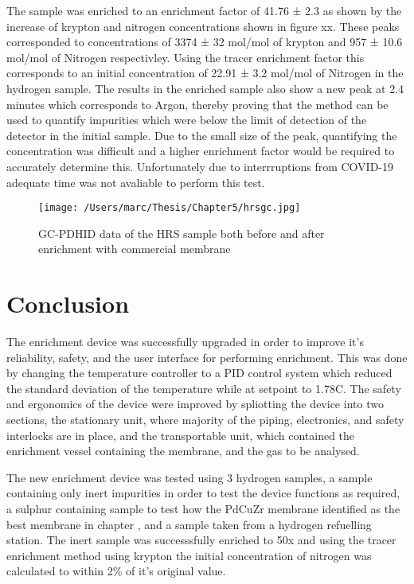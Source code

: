 The sample was enriched to an enrichment factor of 41.76 ± 2.3 as shown by the increase of krypton and nitrogen concentrations shown in figure xx. These peaks corresponded to concentrations of 3374 ± 32 \textmu mol/mol of krypton and 957 ± 10.6 \textmu mol/mol of Nitrogen respectivley. Using the tracer enrichment factor this corresponds to an initial concentration  of 22.91 ± 3.2  \textmu mol/mol of Nitrogen  in the hydrogen sample. The results in the enriched sample also show a new peak at 2.4 minutes which corresponds to Argon, thereby proving that the method can be used to quantify impurities which were below the limit of detection of the detector in the initial sample. Due to the small size of the peak, quantifying the concentration was difficult and a higher enrichment factor would be required to accurately determine this. Unfortunately due to interrruptions from COVID-19 adequate time was not avaliable to perform this test. 

\begin{figure}[H]
    \centering
    \texttt{[image: /Users/marc/Thesis/Chapter5/hrsgc.jpg]}
    \caption{GC-PDHID data of the HRS sample both before and after enrichment with commercial membrane}
    \label{HRSGCENRICH}
\end{figure}

\section{Conclusion}
The enrichment device was successfully upgraded in order to improve it's reliability, safety, and the user interface for performing enrichment. This was done by changing the temperature controller to a PID control system which reduced the standard deviation of the temperature while at setpoint to 1.78\textdegree C. The safety and ergonomics of the device were improved by spliotting the device into two sections, the stationary unit, where majority of the piping, electronics, and safety interlocks are in place, and the transportable unit, which contained the enrichment vessel containing the membrane, and the gas to be analysed. 

The new enrichment device was tested using 3 hydrogen samples, a sample containing only inert impurities in order to test the device functions as required, a sulphur containing sample to test how the PdCuZr membrane identified as the best membrane in chapter \label{proc-testingchapref}, and a sample taken from a hydrogen refuelling station. The inert sample was successsfully enriched to 50x and using the tracer enrichment method using krypton the initial concentration of nitrogen was calculated to within 2\% of it's original value. 


